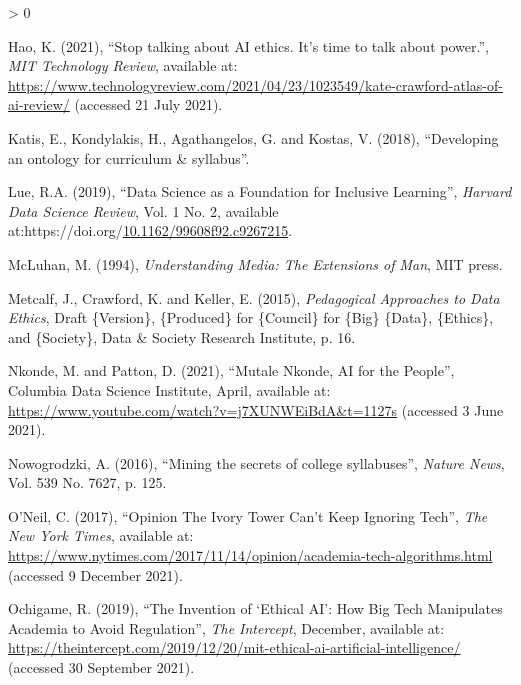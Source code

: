 \documentclass[
]{article}
\newlength{\cslhangindent}
\newenvironment{CSLReferences}[2] %
 {%
  \setlength{\parindent}{0pt}
  \ifodd #1 \everypar{\setlength{\hangindent}{\cslhangindent}}\ignorespaces\fi
  \ifnum #2 > 0
  \setlength{\parskip}{#2\baselineskip}
  \fi
 }%
 {}
\begin{document}
\begin{CSLReferences}{1}{0}
\leavevmode\hypertarget{ref-haoStopTalkingAI2021}{}%
Hao, K. (2021), {``Stop talking about {AI} ethics. {It}'s time to talk
about power.''}, \emph{MIT Technology Review}, available at:
\url{https://www.technologyreview.com/2021/04/23/1023549/kate-crawford-atlas-of-ai-review/}
(accessed 21 July 2021).

\leavevmode\hypertarget{ref-katis_2018}{}%
Katis, E., Kondylakis, H., Agathangelos, G. and Kostas, V. (2018),
{``Developing an ontology for curriculum \& syllabus''}.

\leavevmode\hypertarget{ref-lueDataScienceFoundation2019}{}%
Lue, R.A. (2019), {``Data {Science} as a {Foundation} for {Inclusive}
{Learning}''}, \emph{Harvard Data Science Review}, Vol. 1 No. 2,
available
at:https://doi.org/\href{https://doi.org/10.1162/99608f92.c9267215}{10.1162/99608f92.c9267215}.

\leavevmode\hypertarget{ref-mcluhan1994understanding}{}%
McLuhan, M. (1994), \emph{Understanding Media: The Extensions of Man},
MIT press.

\leavevmode\hypertarget{ref-metcalfPedagogicalApproachesData2015}{}%
Metcalf, J., Crawford, K. and Keller, E. (2015), \emph{Pedagogical
{Approaches} to {Data} {Ethics}}, Draft \{Version\}, \{Produced\} for
\{Council\} for \{Big\} \{Data\}, \{Ethics\}, and \{Society\}, Data \&
Society Research Institute, p. 16.

\leavevmode\hypertarget{ref-nkondeMutaleNkondeAI2021}{}%
Nkonde, M. and Patton, D. (2021), {``Mutale {Nkonde}, {AI} for the
{People}''}, Columbia Data Science Institute, April, available at:
\url{https://www.youtube.com/watch?v=j7XUNWEiBdA\&t=1127s} (accessed 3
June 2021).

\leavevmode\hypertarget{ref-nowogrodzki2016mining}{}%
Nowogrodzki, A. (2016), {``Mining the secrets of college syllabuses''},
\emph{Nature News}, Vol. 539 No. 7627, p. 125.

\leavevmode\hypertarget{ref-oneilOpinionIvoryTower2017}{}%
O'Neil, C. (2017), {``Opinion {{}} {The} {Ivory} {Tower} {Can}'t {Keep}
{Ignoring} {Tech}''}, \emph{The New York Times}, available at:
\url{https://www.nytimes.com/2017/11/14/opinion/academia-tech-algorithms.html}
(accessed 9 December 2021).

\leavevmode\hypertarget{ref-ochigameInventionEthicalAI2019}{}%
Ochigame, R. (2019), {``The {Invention} of {`{Ethical} {AI}'}: {How}
{Big} {Tech} {Manipulates} {Academia} to {Avoid} {Regulation}''},
\emph{The Intercept}, December, available at:
\url{https://theintercept.com/2019/12/20/mit-ethical-ai-artificial-intelligence/}
(accessed 30 September 2021).


\end{CSLReferences}
\end{document}
